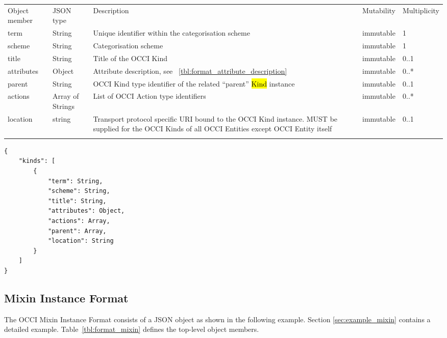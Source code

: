\documentclass[10pt,a4paper]{article}
\begin{document}
 {
    \begin{tabularx}{\textwidth}{llXll}
    \toprule
    Object member & JSON type & Description & Mutability & Multiplicity \\
    \colrule
    term & String & Unique identifier within the categorisation scheme &
immutable & 1 \\

    scheme & String & Categorisation scheme & immutable & 1 \\
    
    title & String & Title of the OCCI Kind & immutable & 0..1 \\
    
    attributes & Object & Attribute description, see
~\ref{tbl:format_attribute_description} & immutable & 0..* \\

    parent & String & OCCI Kind type identifier of the
related ``parent'' \hl{Kind} instance & immutable & 0..1 \\

    actions & Array of Strings & List of OCCI Action type
identifiers & immutable & 0..* \\

    location & string & Transport protocol specific URI bound to the OCCI Kind
instance. MUST be supplied for the OCCI Kinds of all OCCI Entities except OCCI
Entity itself & immutable & 0..1 \\
    \botrule
    \end{tabularx}
}

\begin{lstlisting}
{
    "kinds": [
        {
            "term": String,
            "scheme": String,
            "title": String,
            "attributes": Object,
            "actions": Array,
            "parent": Array,
            "location": String
        }
    ]
}
\end{lstlisting}

\subsection{Mixin Instance Format}
\label{sec:format_mixin}

The OCCI Mixin Instance Format consists of a JSON object as shown in the following example. Section \ref{sec:example_mixin} contains a detailed example.
Table~\ref{tbl:format_mixin} defines the top-level object members.
\end{document}
